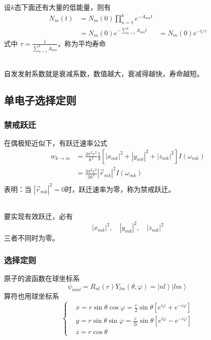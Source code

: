 \begin{frame} 
  \frametitle{}
  设$k$态下面还有大量的低能量，则有
  \[
  \begin{aligned}
    N_m (t)  &= N_m (0)\prod_{n=1}^k e^{-A_{mn} t} \\ 
     &=  N_m (0) e^{-\sum_{n=1}^k A_{mn} t}
     &= N_m (0) e^{-t / \tau}
  \end{aligned}  
   \]
   式中 $\tau = \frac{1}{\sum_{n=1}^k A_{mn}} $，称为平均寿命 

   ~~\\ 
   自发发射系数就是衰减系数，数值越大，衰减得越快，寿命越短。
\end{frame} 

\subsection{单电子选择定则}

\begin{frame} 
  \frametitle{禁戒跃迁}
  在偶极矩近似下，有跃迁速率公式
  \[ 
   \begin{aligned}
     w_{k\to m} &= \frac{4\pi ^2 e^2 }{\hbar^2} \frac{1}{3}\left[\left\vert x_{mk} \right\vert ^2 + \left\vert y_{mk} \right\vert ^2 + \left\vert z_{mk} \right\vert ^2 \right]I(\omega _{mk}) \\ 
     &= \frac{4\pi ^2 e^2 }{3\hbar^2} \left\vert \vec{r}_{mk} \right\vert ^2 I(\omega _{mk}) \\
   \end{aligned}
    \]
  表明：当 $\left\vert \vec{r}_{mk} \right\vert ^2 =0$时，跃迁速率为零，称为禁戒跃迁。
  
  ~~\\ 
  要实现有效跃迁，必有 
  \[\left\vert x_{mk} \right\vert ^2, \quad \left\vert y_{mk} \right\vert ^2 ,\quad \left\vert z_{mk} \right\vert ^2 \]
三者不同时为零。
\end{frame} 

\begin{frame} 
  \frametitle{选择定则}
  原子的波函数在球坐标系
  \[\psi_{nml} = R_{nl}(r)Y_{lm}(\theta,\varphi) = \left\vert nl \right\rangle \left\vert lm \right\rangle\]
  算符也用球坐标系
  $$\left\{\begin{aligned}
	  &x= r\sin \theta \cos \varphi = \frac{r}{2 }\sin \theta [e^{i\varphi} + e^{-i\varphi}]\\
	  &y= r\sin \theta \sin \varphi  = \frac{r}{2i }\sin \theta [e^{i\varphi} - e^{-i\varphi}]\\
	  &z= r\cos \theta
  \end{aligned} \right.$$ 
\end{frame} 

